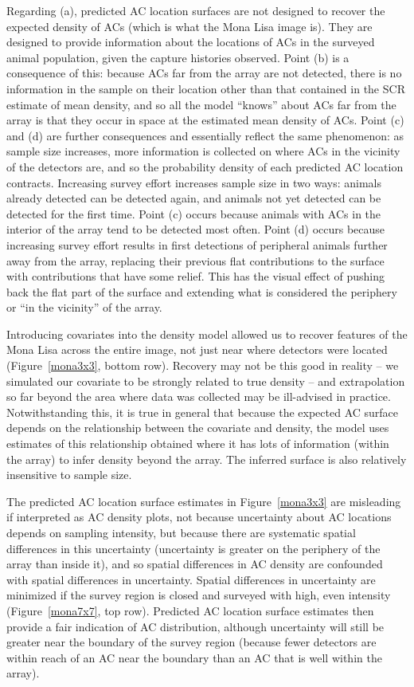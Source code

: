 \documentclass[useAMS,usenatbib,referee]{biom}
\begin{document}
Regarding (a), predicted AC location surfaces are not designed to recover the expected density of ACs (which is what the Mona Lisa image is). They are designed to provide information about the locations of ACs in the surveyed animal population, given the capture histories observed. Point (b) is a consequence of this: because ACs far from the array are not detected, there is no information in the sample on their location other than that contained in the SCR estimate of mean density, and so all the model ``knows'' about ACs far from the array is that they occur in space at the estimated mean density of ACs. Point (c) and (d) are further consequences and essentially reflect the same phenomenon: as sample size increases, more information is collected on where ACs in the vicinity of the detectors are, and so the probability density of each predicted AC location contracts. Increasing survey effort increases sample size in two ways: animals already detected can be detected again, and animals not yet detected can be detected for the first time. Point (c) occurs because animals with ACs in the interior of the array tend to be detected most often. Point (d) occurs because increasing survey effort results in first detections of peripheral animals further away from the array, replacing their previous flat contributions to the surface with contributions that have some relief. This has the visual effect of pushing back the flat part of the surface and extending what is considered the periphery or ``in the vicinity'' of the array. 

Introducing covariates into the density model allowed us to recover features of the Mona Lisa across the entire image, not just near where detectors were located (Figure~\ref{mona3x3}, bottom row). Recovery may not be this good in reality -- we simulated our covariate to be strongly related to true density -- and extrapolation so far beyond the area where data was collected may be ill-advised in practice. Notwithstanding this, it is true in general that because the expected AC surface depends on the relationship between the covariate and density, the model uses estimates of this relationship obtained where it has lots of information (within the array) to infer density beyond the array. The inferred surface is also relatively insensitive to sample size.

The predicted AC location surface estimates in Figure~\ref{mona3x3} are misleading if interpreted as AC density plots, not because uncertainty about AC locations depends on sampling intensity, but because there are systematic spatial differences in this uncertainty (uncertainty is greater on the periphery of the array than inside it), and so spatial differences in AC density are confounded with spatial differences in uncertainty. Spatial differences in uncertainty are minimized if the survey region is closed and surveyed with high, even intensity (Figure~\ref{mona7x7}, top row). Predicted AC location surface estimates then provide a fair indication of AC distribution, although uncertainty will still be greater near the boundary of the survey region (because fewer detectors are within reach of an AC near the boundary than an AC that is well within the array). 
\end{document}
